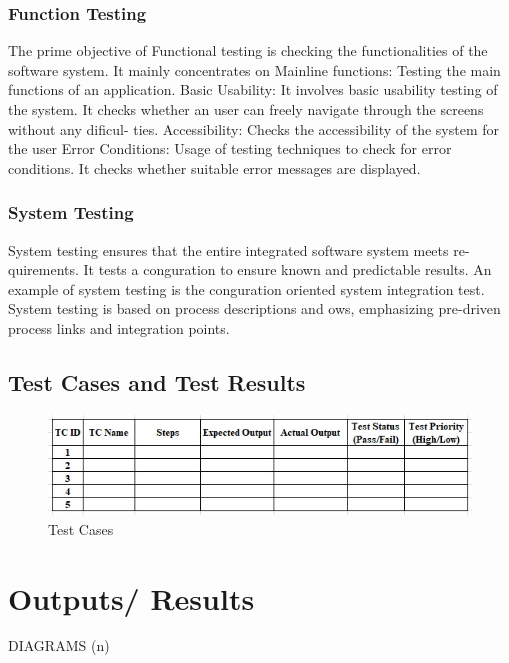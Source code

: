 \documentclass{report} %
\begin{document}
			\subsection{Function Testing}
			The prime objective of Functional testing is checking the functionalities of
			the software system. It mainly concentrates on Mainline functions: Testing
			the main functions of an application.
			Basic Usability: It involves basic usability testing of the system. It checks
			whether an user can freely navigate through the screens without any dificul-
			ties.
			Accessibility: Checks the accessibility of the system for the user
			Error Conditions: Usage of testing techniques to check for error conditions.
			It checks whether suitable error messages are displayed.
			
			\subsection{System Testing}
			System testing ensures that the entire integrated software system meets re-
			quirements. It tests a conguration to ensure known and predictable results.
			An example of system testing is the conguration oriented system integration
			test. System testing is based on process descriptions and 
			ows, emphasizing
			pre-driven process links and integration points.
		
		\section{Test Cases and Test Results}
			
			\begin{figure}[h]
				\centering
				\includegraphics{images/testcases.jpg}
				\caption{Test Cases}
			\end{figure}



	\chapter{Outputs/ Results}
	\pagebreak
		DIAGRAMS (n)
\end{document}
